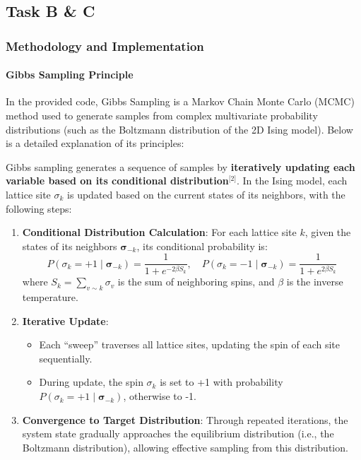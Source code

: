 \documentclass[11pt]{article}
\providecommand{\tightlist}{%
      \setlength{\itemsep}{0pt}\setlength{\parskip}{0pt}}
\begin{document}
    \subsection{Task B \& C}\label{task-b-c}

\subsubsection{Methodology and
Implementation}\label{methodology-and-implementation}

\paragraph{Gibbs Sampling Principle}\label{gibbs-sampling-principle}

In the provided code, Gibbs Sampling is a Markov Chain Monte Carlo
(MCMC) method used to generate samples from complex multivariate
probability distributions (such as the Boltzmann distribution of the 2D
Ising model). Below is a detailed explanation of its principles:

Gibbs sampling generates a sequence of samples by \textbf{iteratively
updating each variable based on its conditional
distribution}\(^\text{[2]}\). In the Ising model, each lattice site
\(\sigma_k\) is updated based on the current states of its neighbors,
with the following steps:

\begin{enumerate}
\def\labelenumi{\arabic{enumi}.}
\item
  \textbf{Conditional Distribution Calculation}: For each lattice site
  \(k\), given the states of its neighbors \(\pmb{\sigma}_{-k}\), its
  conditional probability is: \[
  P(\sigma_k = +1 \mid \pmb{\sigma}_{-k}) = \frac{1}{1 + e^{-2\beta S_k}}, \quad P(\sigma_k = -1 \mid \pmb{\sigma}_{-k}) = \frac{1}{1 + e^{2\beta S_k}}
  \] where \(S_k = \sum_{v \sim k} \sigma_v\) is the sum of neighboring
  spins, and \(\beta\) is the inverse temperature.
\item
  \textbf{Iterative Update}:

  \begin{itemize}
  \tightlist
  \item
    Each ``sweep'' traverses all lattice sites, updating the spin of
    each site sequentially.
  \item
    During update, the spin \(\sigma_k\) is set to +1 with probability
    \(P(\sigma_k = +1 \mid \pmb{\sigma}_{-k})\), otherwise to -1.
  \end{itemize}
\item
  \textbf{Convergence to Target Distribution}: Through repeated
  iterations, the system state gradually approaches the equilibrium
  distribution (i.e., the Boltzmann distribution), allowing effective
  sampling from this distribution.
\end{enumerate}
\end{document}
